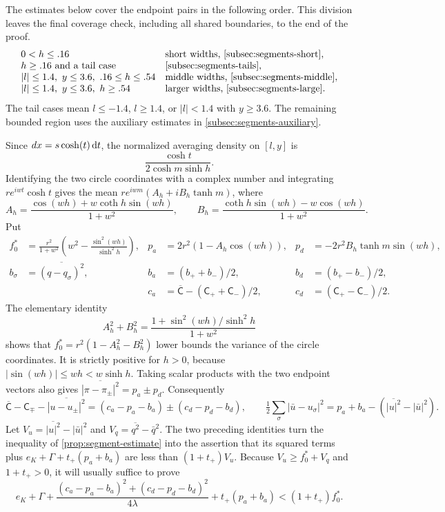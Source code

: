 The estimates below cover the endpoint pairs in the following order. This division leaves the final coverage check, including all shared boundaries, to the end of the proof.
\[
\begin{array}{ll}
 0<h\le .16 & \text{short widths, \cref{subsec:segments-short}},\\
 h\ge .16\text{ and a tail case} &
       \text{\cref{subsec:segments-tails}},\\
 |l|\le1.4,\ y\le3.6,\ .16\le h\le.54 &
       \text{middle widths, \cref{subsec:segments-middle}},\\
 |l|\le1.4,\ y\le3.6,\ h\ge.54 &
       \text{larger widths, \cref{subsec:segments-large}}.
\end{array}
\]
The tail cases mean $l\le-1.4$, $l\ge1.4$, or $|l|<1.4$ with $y\ge3.6$. The remaining bounded region uses the auxiliary estimates in \cref{subsec:segments-auxiliary}.

Since $dx=s\cosh(t)\,\mathrm{d} t$, the normalized averaging density on $[l,y]$ is
\[
 \frac{\cosh t}{2\cosh m\sinh h}.
\]
Identifying the two circle coordinates with a complex number and integrating $re^{iwt}\cosh t$ gives the mean $re^{iwm}(A_h+iB_h\tanh m)$, where
\[
 A_h=\frac{\cos(wh)+w\coth h\sin(wh)}{1+w^2},\qquad
 B_h=\frac{\coth h\sin(wh)-w\cos(wh)}{1+w^2}.
\]
Put
\[
\begin{aligned}
 f_0^*&=\frac{r^2}{1+w^2}\left(w^2-\frac{\sin^2(wh)}{\sinh^2 h}\right),
 &p_a&=2r^2(1-A_h\cos(wh)),& p_d&=-2r^2 B_h\tanh m\sin(wh),\\
 b_\sigma&=\overline{(q-q_\sigma)^2},
 &b_a&=(b_++b_-)/2,& b_d&=(b_+-b_-)/2,\\
 &&c_a&=\overline{\mathsf C}-(\mathsf C_++\mathsf C_-)/2,& c_d&=(\mathsf C_+-\mathsf C_-)/2 .
\end{aligned}
\]
The elementary identity
\[
 A_h^2+B_h^2
 =\frac{1+\sin^2(wh)/\sinh^2h}{1+w^2}
\]
shows that $f_0^*=r^2(1-A_h^2-B_h^2)$ lower bounds the variance of the circle coordinates. It is strictly positive for $h>0$, because $|\sin(wh)|\le wh<w\sinh h$. Taking scalar products with the two endpoint vectors also gives $\overline{|\pi-\pi_\pm|^2}=p_a\pm p_d$. Consequently
\[
 \overline{\mathsf C}-\mathsf C_{\mp}-\overline{|u-u_\pm|^2}
             =(c_a-p_a-b_a)\pm(c_d-p_d-b_d),\qquad
 \tfrac12\sum_\sigma|\bar u-u_\sigma|^2
             =p_a+b_a-(\overline{|u|^2}-|\bar u|^2).
\]
Let $V_u=\overline{|u|^2}-|\bar u|^2$ and $V_q=\overline{q^2}-\bar q^2$. The two preceding identities turn the inequality of \cref{prop:segment-estimate} into the assertion that its squared terms plus $e_K+\Gamma+t_+(p_a+b_a)$ are less than $(1+t_+)V_u$. Because $V_u\ge f_0^*+V_q$ and $1+t_+>0$, it will usually suffice to prove
\begin{equation}
 e_K+\Gamma+
 \frac{(c_a-p_a-b_a)^2+(c_d-p_d-b_d)^2}{4\lambda}
 +t_+(p_a+b_a)<(1+t_+) f_0^*. \tag{s0}\label{eq:s0}
\end{equation}

